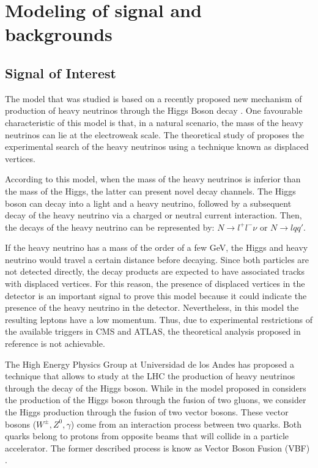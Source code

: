 \chapter{Modeling of signal and backgrounds}
\label{Model_chapter}
 
\section{Signal of Interest}

The model that was studied is based on a recently proposed new mechanism of production of heavy neutrinos through the Higgs Boson decay \cite{Seesaw Mechanism with displaced vertices}. One
favourable characteristic of this model is that, in a natural scenario, the mass of the heavy neutrinos can lie at the electroweak scale. The theoretical study of \cite{Seesaw Mechanism with displaced vertices} proposes the experimental search of the heavy neutrinos using a technique known as displaced vertices.

According to this model, when the mass of the heavy neutrinos is inferior than the mass of the Higgs, the latter can present novel decay channels. The Higgs boson can decay into a light and a heavy neutrino, followed by a subsequent decay of the heavy neutrino via a charged or neutral current interaction. Then, the decays of the heavy neutrino can be represented by: $N \rightarrow l^+ l^- \nu$ or $N \rightarrow l q q'$. 

If the heavy neutrino has a mass of the order of a few GeV, the Higgs and heavy neutrino would travel a certain distance before decaying. Since both particles are not detected directly, the decay products are expected to have associated tracks with displaced vertices. For this reason, the presence of displaced vertices in the detector is an important signal to prove this model because it could indicate the presence of the heavy neutrino in the detector. Nevertheless, in this model the resulting leptons have a low momentum. Thus, due to experimental restrictions of the available triggers in CMS and ATLAS, the theoretical analysis proposed in reference \cite{Seesaw Mechanism with displaced vertices} is not achievable.  

The High Energy Physics Group at Universidad de los Andes has proposed a technique that allows to study at the LHC the production of heavy neutrinos through the decay of the Higgs boson. While in 
the model proposed in \cite{Seesaw Mechanism with displaced vertices} considers the production of the Higgs boson through the fusion of two gluons, we consider the Higgs production through the fusion
of two vector bosons. These vector bosons ($W^{\pm},Z^0,\gamma$) come from an interaction process between two quarks. Both quarks belong to protons from opposite beams that will collide in a 
particle accelerator. The former described process is know as Vector Boson Fusion (VBF) \cite{VBF processes}. 

